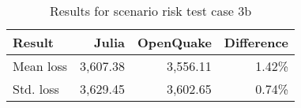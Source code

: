 \begin{table}[htbp]

\centering
\begin{tabular}{ l r r r }

\hline
\rowcolor{anti-flashwhite}
\bf{Result} & \bf{Julia} & \bf{OpenQuake} & \bf{Difference}\\
\hline
Mean loss & 3,607.38 & 3,556.11 & 1.42\% \\
Std. loss & 3,629.45 & 3,602.65 & 0.74\% \\
\hline
\end{tabular}

\caption{Results for scenario risk test case 3b}
\label{tab:result-sr-3b}
\end{table}